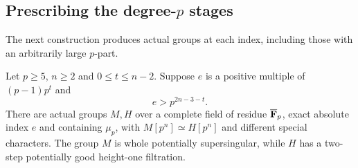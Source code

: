 \subsection{Prescribing the degree-$p$ stages}
The next construction produces actual groups at each index, including those with an arbitrarily large $p$-part.

\begin{proposition}\label{prop:mixed-stage-construction}
Let $p\ge5$, $n\ge2$ and $0\le t\le n-2$. Suppose $e$ is a positive multiple of $(p-1)p^t$ and
\[
                             e>p^{2n-3-t}.
\]
There are actual groups $M,H$ over a complete field of residue $\overline{\mathbf F}_p$, exact absolute index $e$ and containing $\mu_p$, with $M[p^n]\simeq H[p^n]$ and different special characters. The group $M$ is whole potentially supersingular, while $H$ has a two-step potentially good height-one filtration.
\end{proposition}

